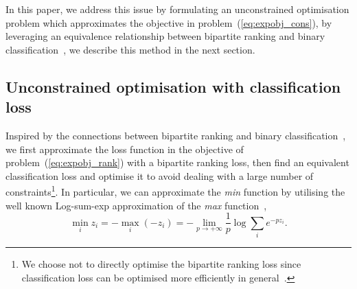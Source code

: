 In this paper, we address this issue by formulating an unconstrained optimisation problem which approximates 
the objective in problem~(\ref{eq:expobj_cons}), by leveraging an equivalence relationship between bipartite 
ranking and binary classification~\cite{ertekin2011equivalence}, we describe this method in the next section.




\subsection{Unconstrained optimisation with classification loss}


Inspired by the connections between bipartite ranking and binary classification~\cite{ertekin2011equivalence,menon2016bipartite},
we first approximate the loss function in the objective of problem~(\ref{eq:expobj_rank}) with
a bipartite ranking loss, then find an equivalent classification loss and optimise it to 
avoid dealing with a large number of 
constraints\footnote{We choose not to directly optimise the bipartite ranking loss 
since classification loss can be optimised more efficiently in general~\cite{ertekin2011equivalence}.}.
%
In particular, 
we can approximate the \emph{min} function by utilising the well known Log-sum-exp approximation 
of the \emph{max} function~\cite[p. 72]{boyd2004convex},
\begin{equation}
\label{eq:minappox}
\min_i z_i = -\max_i (-z_i) = -\lim_{p \to +\infty} \frac{1}{p} \log \sum_i e^{-p z_i}.
\end{equation}

